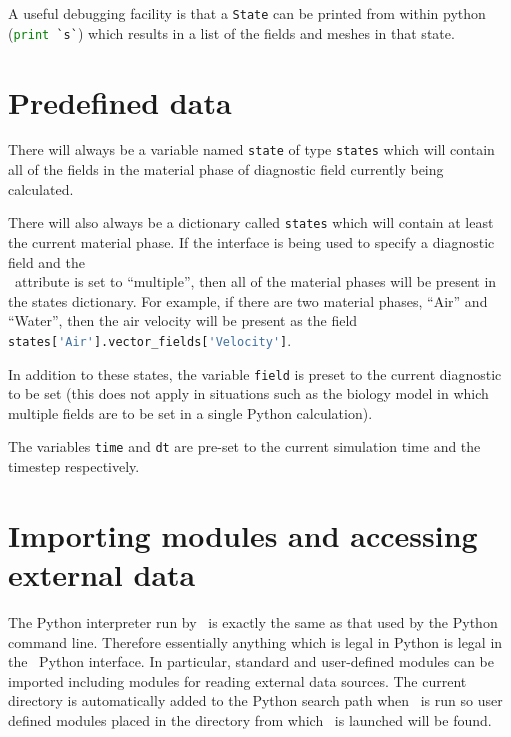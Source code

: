 A useful debugging facility is that a \lstinline[language=Python]+State+ can
be printed from within python (\lstinline[language=Python]+print `s`+) which
results in a list of the fields and meshes in that state.

\section{Predefined data}

 There will always be a variable named
\lstinline[language=Python]+state+ of type
\lstinline[language=Python]+states+ which will contain all of the fields in
the material phase of diagnostic field currently being calculated.

There will also always be a dictionary called \lstinline[language=Python]+states+
which will contain at least the current material phase. If the interface is
being used to specify a diagnostic field and the\\
\ attribute is set to
``multiple'', then all of the material phases will be present in the
states dictionary. For example, if there are two material phases, ``Air''
and ``Water'', then the air velocity will be present as the field\\
\lstinline[language=Python]+states['Air'].vector_fields['Velocity']+. 

In addition to these states, the variable \lstinline[language=Python]+field+
is preset to the current diagnostic to be set (this does not apply in
situations such as the biology model in which multiple fields are to be set
in a single Python calculation). 

The variables \lstinline[language=Python]+time+ and
\lstinline[language=Python]+dt+ are pre-set to the current simulation time
and the timestep respectively.

\section{Importing modules and accessing external data}

The Python interpreter run by \fluidity\ is exactly the same as that used by
the Python command line. Therefore essentially anything which is legal in
Python is legal in the \fluidity\ Python interface. In particular, standard
and user-defined modules can be imported including modules for reading
external data sources. The current directory is automatically added to the
Python search path when \fluidity\ is run so user defined modules placed in
the directory from which \fluidity\ is launched will be found.

